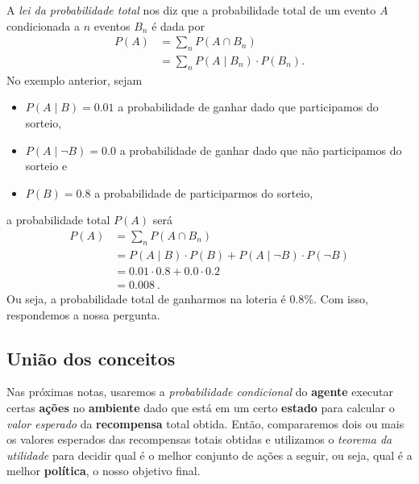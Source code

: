 \documentclass{article}
\begin{document}
                A \emph{lei da probabilidade total} nos diz que a probabilidade total de um evento $A$ condicionada a $n$ eventos $B_n$ é dada por
                \begin{equation}
                \begin{aligned}
                    P(A) & = \sum_{n}{P(A \cap B_n)} \\
                    & = \sum_{n}{P(A \mid B_n) \cdot P(B_n)}.
                \end{aligned}
                \end{equation}
                No exemplo anterior, sejam 
                \begin{itemize}
                    \item $P(A \mid B) = 0.01$ a probabilidade de ganhar dado que participamos do sorteio,
                    \item $P(A \mid \lnot B) = 0.0$ a probabilidade de ganhar dado que não participamos do sorteio e
                    \item $P(B) = 0.8$ a probabilidade de participarmos do sorteio,
                \end{itemize}
                a probabilidade total $P(A)$ será
                \begin{equation*}
                \begin{aligned}
                    P(A) & = \sum_{n}{P(A \cap B_n)}\\
                    & = P(A \mid B) \cdot P(B) + P(A \mid \lnot B) \cdot P(\lnot B)\\
                    & = 0.01 \cdot 0.8 + 0.0 \cdot 0.2\\
                    & = 0.008\ .
                \end{aligned}
                \end{equation*}
                Ou seja, a probabilidade total de ganharmos na loteria é $0.8\%$.
                Com isso, respondemos a nossa pergunta.
            
        \subsection{União dos conceitos}
                
            Nas próximas notas, usaremos a \emph{probabilidade condicional} do \textbf{agente} executar certas \textbf{ações} no \textbf{ambiente} dado que está em um certo \textbf{estado} para calcular o \emph{valor esperado} da \textbf{recompensa} total obtida.
            Então, compararemos dois ou mais os valores esperados das recompensas totais obtidas e utilizamos o \emph{teorema da utilidade} para decidir qual é o melhor conjunto de ações a seguir, ou seja, qual é a melhor \textbf{política}, o nosso objetivo final.
            
    \printbibliography
    
\end{document}
